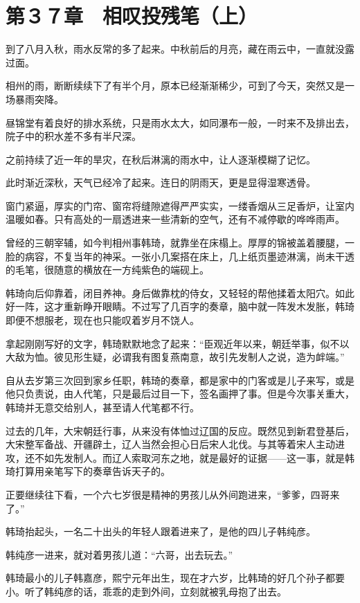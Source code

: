 \section{第３７章　相叹投残笔（上）}

到了八月入秋，雨水反常的多了起来。中秋前后的月亮，藏在雨云中，一直就没露过面。

相州的雨，断断续续下了有半个月，原本已经渐渐稀少，可到了今天，突然又是一场暴雨突降。

昼锦堂有着良好的排水系统，只是雨水太大，如同瀑布一般，一时来不及排出去，院子中的积水差不多有半尺深。

之前持续了近一年的旱灾，在秋后淋漓的雨水中，让人逐渐模糊了记忆。

此时渐近深秋，天气已经冷了起来。连日的阴雨天，更是显得湿寒透骨。

窗门紧逼，厚实的门帘、窗帘将缝隙遮得严严实实，一缕香烟从三足香炉，让室内温暖如春。只有高处的一扇透进来一些清新的空气，还有不减停歇的哗哗雨声。

曾经的三朝宰辅，如今判相州事韩琦，就靠坐在床榻上。厚厚的锦被盖着腰腿，一脸的病容，不复当年的神采。一张小几案搭在床上，几上纸页墨迹淋漓，尚未干透的毛笔，很随意的横放在一方纯紫色的端砚上。

韩琦向后仰靠着，闭目养神。身后做靠枕的侍女，又轻轻的帮他揉着太阳穴。如此好一阵，这才重新睁开眼睛。不过写了几百字的奏章，脑中就一阵发木发胀，韩琦即便不想服老，现在也只能叹着岁月不饶人。

拿起刚刚写好的文字，韩琦默默地念了起来：“臣观近年以来，朝廷举事，似不以大敌为恤。彼见形生疑，必谓我有图复燕南意，故引先发制人之说，造为衅端。”

自从去岁第三次回到家乡任职，韩琦的奏章，都是家中的门客或是儿子来写，或是他只负责说，由人代笔，只是最后过目一下，签名画押了事。但是今次事关重大，韩琦并无意交给别人，甚至请人代笔都不行。

过去的几年，大宋朝廷行事，从来没有体恤过辽国的反应。既然见到新君登基后，大宋整军备战、开疆辟土，辽人当然会担心日后宋人北伐。与其等着宋人主动进攻，还不如先发制人。而辽人索取河东之地，就是最好的证据——这一事，就是韩琦打算用亲笔写下的奏章告诉天子的。

正要继续往下看，一个六七岁很是精神的男孩儿从外间跑进来，“爹爹，四哥来了。”

韩琦抬起头，一名二十出头的年轻人跟着进来了，是他的四儿子韩纯彦。

韩纯彦一进来，就对着男孩儿道：“六哥，出去玩去。”

韩琦最小的儿子韩嘉彦，熙宁元年出生，现在才六岁，比韩琦的好几个孙子都要小。听了韩纯彦的话，乖乖的走到外间，立刻就被乳母抱了出去。

